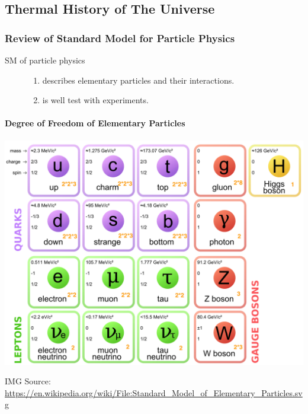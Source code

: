 \documentclass[letterpaper,10pt,english]{sphinxmanual}
\begin{document}
{\subsection{Thermal History of The Universe}
\label{Cosmology/cosmoIndex:thermal-history-of-the-universe}

\subsubsection{Review of Standard Model for Particle Physics}
\label{Cosmology/cosmoIndex:review-of-standard-model-for-particle-physics}\begin{description}
\item[{SM of particle physics}] \leavevmode\begin{enumerate}
\item {} 
describes elementary particles and their interactions.

\item {} 
is well test with experiments.

\end{enumerate}

\end{description}


\paragraph{Degree of Freedom of Elementary Particles}
\label{Cosmology/cosmoIndex:degree-of-freedom-of-elementary-particles}
\includegraphics{Standard_Model_of_Elementary_Particles.png}

IMG Source: \href{https://en.wikipedia.org/wiki/File:Standard\_Model\_of\_Elementary\_Particles.svg}{https://en.wikipedia.org/wiki/File:Standard\_Model\_of\_Elementary\_Particles.svg}

}
\end{document}
